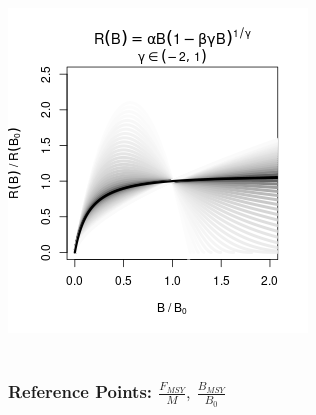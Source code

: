 \documentclass[a0paper,portrait]{baposter}
\begin{document}
\begin{poster}
{\begin{minipage}[h!]{0.55\textwidth}
\begin{minipage}[b]{0.48\textwidth}
		\includegraphics[width=\textwidth]{../../ddBias/g3Grey.png}
		$~$\\$~$\\
	\end{minipage}
	
	\vspace*{-2cm}
	\subsubsection*{Reference Points: $\frac{F_{MSY}}{M}, ~\frac{B_{MSY}}{B_0}$}
	
	

\end{minipage}}
\end{poster}
\end{document}
